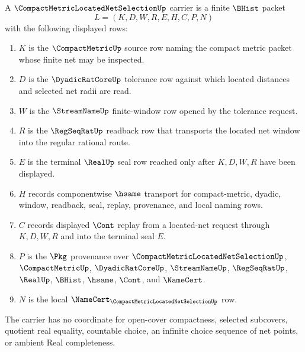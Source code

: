 \begin{definition}
\label{def:compact-metric-located-net-selection-carrier}
A $\CompactMetricLocatedNetSelectionUp$ carrier is a finite $\BHist$ packet
$$
L=(K,D,W,R,E,H,C,P,N)
$$
with the following displayed rows:
\begin{enumerate}
\item $K$ is the $\CompactMetricUp$ source row naming the compact metric packet whose finite net may be inspected.
\item $D$ is the $\DyadicRatCoreUp$ tolerance row against which located distances and selected net radii are read.
\item $W$ is the $\StreamNameUp$ finite-window row opened by the tolerance request.
\item $R$ is the $\RegSeqRatUp$ readback row that transports the located net window into the regular rational route.
\item $E$ is the terminal $\RealUp$ seal row reached only after $K,D,W,R$ have been displayed.
\item $H$ records componentwise $\hsame$ transport for compact-metric, dyadic, window, readback, seal, replay, provenance, and local naming rows.
\item $C$ records displayed $\Cont$ replay from a located-net request through $K,D,W,R$ and into the terminal seal $E$.
\item $P$ is the $\Pkg$ provenance over $\CompactMetricLocatedNetSelectionUp$, $\CompactMetricUp$, $\DyadicRatCoreUp$, $\StreamNameUp$, $\RegSeqRatUp$, $\RealUp$, $\BHist$, $\hsame$, $\Cont$, and $\NameCert$.
\item $N$ is the local $\NameCert_{\CompactMetricLocatedNetSelectionUp}$ row.
\end{enumerate}
The carrier has no coordinate for open-cover compactness, selected subcovers, quotient real equality, countable choice, an infinite choice sequence of net points, or ambient Real completeness.
\end{definition}

